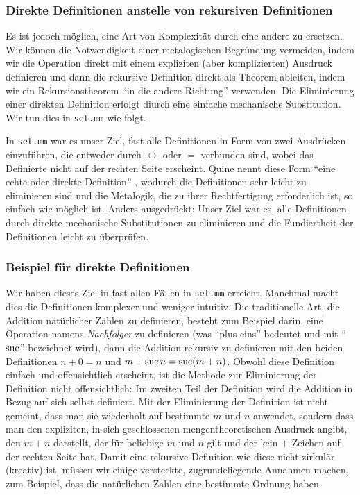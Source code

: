 \subsubsection{Direkte Definitionen anstelle von rekursiven Definitionen}

Es ist jedoch möglich, eine Art von Komplexität durch eine andere zu ersetzen.  Wir können die Notwendigkeit einer metalogischen Begründung vermeiden, indem wir die Operation direkt mit einem expliziten (aber komplizierten) Ausdruck definieren und dann die rekursive Definition direkt als Theorem ableiten, indem wir ein Rekursionstheorem "`in die andere Richtung"' verwenden. Die Eliminierung einer direkten Definition erfolgt diurch eine einfache mechanische Substitution. Wir tun dies in \texttt{set.mm} wie folgt.

In \texttt{set.mm} war es unser Ziel, fast alle Definitionen in Form von zwei Ausdrücken einzuführen, die entweder durch $\leftrightarrow$ oder $=$ verbunden sind, wobei das Definierte nicht auf der rechten Seite erscheint.  Quine nennt diese Form "`eine echte oder direkte Definition"' \cite[S. 174]{Quine}, wodurch die Definitionen sehr leicht zu eliminieren sind und die Metalogik, die zu ihrer Rechtfertigung erforderlich ist, so einfach wie möglich ist. Anders ausgedrückt: Unser Ziel war es, alle Definitionen durch direkte mechanische Substitutionen zu eliminieren und die Fundiertheit der Definitionen leicht zu überprüfen.

\subsubsection{Beispiel für direkte Definitionen}

Wir haben dieses Ziel in fast allen Fällen in \texttt{set.mm} erreicht. Manchmal macht dies die Definitionen komplexer und weniger intuitiv. Die traditionelle Art, die Addition natürlicher Zahlen zu definieren, besteht zum Beispiel darin, eine Operation namens {\em Nachfolger} zu definieren (was "`plus eins"' bedeutet und mit "`${\rm suc}$"' bezeichnet wird), dann die Addition rekursiv zu definieren mit den beiden Definitionen $n + 0 = n$ und $m + {\rm suc}\,n = {\rm suc} (m + n)$.  Obwohl diese Definition einfach und offensichtlich erscheint, ist die Methode zur Eliminierung der Definition nicht offensichtlich: Im zweiten Teil der Definition wird die Addition in Bezug auf sich selbst definiert.  Mit der Eliminierung der Definition ist nicht gemeint, dass man sie wiederholt auf bestimmte $m$ und $n$ anwendet, sondern dass man den expliziten, in sich geschlossenen mengentheoretischen Ausdruck angibt, den $m + n$ darstellt, der für beliebige $m$ und $n$ gilt und der kein $+$-Zeichen auf der rechten Seite hat.  Damit eine rekursive Definition wie diese nicht zirkulär (kreativ) ist, müssen wir einige versteckte, zugrundeliegende Annahmen machen, zum Beispiel, dass die natürlichen Zahlen eine bestimmte Ordnung haben.

